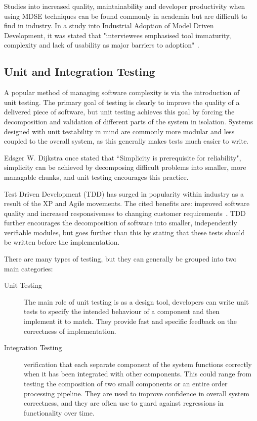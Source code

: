 \documentclass{cshonours}
\begin{document}
Studies into increased quality, maintainability and developer productivity when using MDSE techniques can be found commonly in academia but are difficult to find in industry. In a study into Industrial Adoption of Model Driven Development, it was stated that "interviewees emphasised tool immaturity, complexity and lack of usability as major barriers to adoption"~\cite{IndustryMDSE}.

\pagebreak
\subsection{Unit and Integration Testing}

A popular method of managing software complexity is via the introduction of unit testing. The primary goal of testing is clearly to improve the quality of a delivered piece of software, but unit testing achieves this goal by forcing the decomposition and validation of different parts of the system in isolation. Systems designed with unit testability in mind are commonly more modular and less coupled to the overall system, as this generally makes tests much easier to write.

Edsger W. Dijkstra once stated that ``Simplicity is prerequisite for reliability", simplicity can be achieved by decomposing difficult problems into smaller, more managable chunks, and unit testing encourages this practice.

Test Driven Development (TDD) has surged in popularity within industry as a result of the XP and Agile movements. The cited benefits are: improved software quality and increased responsiveness to changing customer requirements~\cite{WikiXP}. TDD further encourages the decomposition of software into smaller, independently verifiable modules, but goes further than this by stating that these tests should be written before the implementation.

There are many types of testing, but they can generally be grouped into two main categories:

\begin{description}
  \item[Unit Testing] The main role of unit testing is as a design tool, developers can write unit tests to specify the intended behaviour of a component and then implement it to match. They provide fast and specific feedback on the correctness of implementation.
  \item[Integration Testing] verification that each separate component of the system functions correctly when it has been integrated with other components. This could range from testing the composition of two small components or an entire order processing pipeline. They are used to improve confidence in overall system correctness, and they are often use to guard against regressions in functionality over time.
\end{description}
\end{document}
